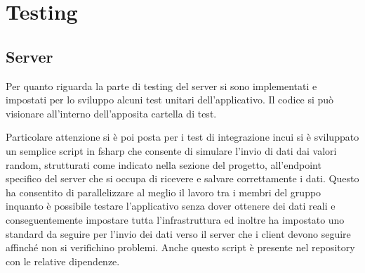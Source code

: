 \section{Testing}

\subsection{Server}

Per quanto riguarda la parte di testing del server si sono implementati e impostati per lo sviluppo alcuni test unitari dell'applicativo. Il codice si pu\`o visionare all'interno dell'apposita cartella di test.

Particolare attenzione si \`e poi posta per i test di integrazione incui si \`e sviluppato un semplice script in fsharp che consente di simulare l'invio di dati dai valori random, strutturati come indicato nella sezione del progetto, all'endpoint specifico del server che si occupa di ricevere e salvare correttamente i dati. Questo ha consentito di parallelizzare al meglio il lavoro tra i membri del gruppo inquanto \`e possibile testare l'applicativo senza dover ottenere dei dati reali e conseguentemente impostare tutta l'infrastruttura ed inoltre ha impostato uno standard da seguire per l'invio dei dati verso il server che i client devono seguire affinch\'e non si verifichino problemi. Anche questo script \`e presente nel repository con le relative dipendenze.

